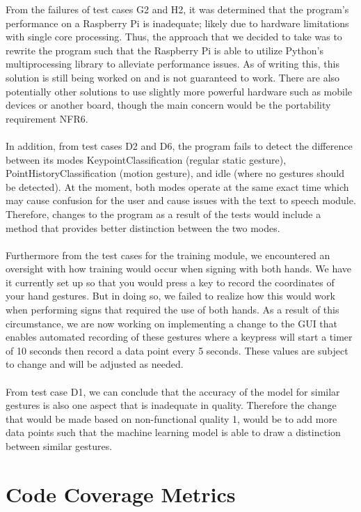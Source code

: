 \documentclass[12pt, titlepage]{article}
\begin{document}
From the failures of test cases G2 and H2, it was determined that the program’s performance on a Raspberry Pi is inadequate; 
likely due to hardware limitations with single core processing. Thus, the approach that we decided to take was to rewrite the 
program such that the Raspberry Pi is able to utilize Python’s multiprocessing library to alleviate performance issues. As of 
writing this, this solution is still being worked on and is not guaranteed to work. There are also potentially other solutions 
to use slightly more powerful hardware such as mobile devices or another board, though the main concern would be the portability requirement NFR6.\\
~\\
In addition, from test cases D2 and D6, the program fails to detect the difference between its modes KeypointClassification 
(regular static gesture), PointHistoryClassification (motion gesture), and idle (where no gestures should be detected). At the 
moment, both modes operate at the same exact time which may cause confusion for the user and cause issues with the text to speech 
module. Therefore, changes to the program as a result of the tests would include a method that provides better distinction between 
the two modes.\\
~\\
Furthermore from the test cases for the training module, we encountered an oversight with how training would occur when signing with 
both hands. We have it currently set up so that you would press a key to record the coordinates of your hand gestures. But in doing so, 
we failed to realize how this would work when performing signs that required the use of both hands. As a result of this circumstance, we 
are now working on implementing a change to the GUI that enables automated recording of these gestures where a keypress will start a timer 
of 10 seconds then record a data point every 5 seconds. These values are subject to change and will be adjusted as needed.\\
~\\
From test case D1, we can conclude that the accuracy of the model for similar gestures is also one aspect that is inadequate in quality. 
Therefore the change that would be made based on non-functional quality 1, would be to add more data points such that the machine learning 
model is able to draw a distinction between similar gestures.

\section{Code Coverage Metrics}
\end{document}
